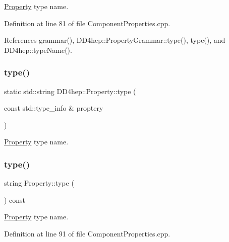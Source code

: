 \hyperlink{class_d_d4hep_1_1_property}{Property} type name. 



Definition at line 81 of file Component\+Properties.\+cpp.



References grammar(), D\+D4hep\+::\+Property\+Grammar\+::type(), type(), and D\+D4hep\+::type\+Name().

\hypertarget{class_d_d4hep_1_1_property_aeeb502311c3a963033cd82c82e2874d9}{}\label{class_d_d4hep_1_1_property_aeeb502311c3a963033cd82c82e2874d9} 
\subsubsection{\texorpdfstring{type()}{type()}\hspace{0.1cm}{\footnotesize\ttfamily [2/3]}}
{\footnotesize\ttfamily static std\+::string D\+D4hep\+::\+Property\+::type (\begin{DoxyParamCaption}\item[{const std\+::type\+\_\+info \&}]{proptery }\end{DoxyParamCaption})\hspace{0.3cm}{\ttfamily [static]}}



\hyperlink{class_d_d4hep_1_1_property}{Property} type name. 

\hypertarget{class_d_d4hep_1_1_property_a7861975224e3bb477939b39b208cd78c}{}\label{class_d_d4hep_1_1_property_a7861975224e3bb477939b39b208cd78c} 
\subsubsection{\texorpdfstring{type()}{type()}\hspace{0.1cm}{\footnotesize\ttfamily [3/3]}}
{\footnotesize\ttfamily string Property\+::type (\begin{DoxyParamCaption}{ }\end{DoxyParamCaption}) const}



\hyperlink{class_d_d4hep_1_1_property}{Property} type name. 



Definition at line 91 of file Component\+Properties.\+cpp.



